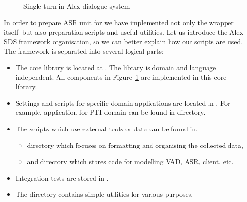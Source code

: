 \begin{figure}
    \begin{center}
    
    \caption{Single turn in Alex dialogue system}
    \label{fig:alex} 
    \end{center}
\end{figure}

In order to prepare \ac{ASR} unit for  we have implemented not only the wrapper itself, but also preparation scripts and useful utilities. 
Let us introduce the Alex \ac{SDS} framework organisation, so we can better explain how our scripts are used.
The framework is separated into several logical parts:
\begin{itemize}
    \item The core library is located at . The library is domain and language independent. All components in Figure~\ref{fig:alex} are implemented in this core library.
    \item Settings and scripts for specific domain applications are located in .
        For example, application for \ac{PTI} domain can be found in  directory.
    \item The scripts which use external tools or data can be found in:
        \begin{itemize}
            \item {} directory which focuses on formatting and organising the collected data,
            \item and \term {} directory which stores code for modelling \ac{VAD}, \ac{ASR},  client, etc.
        \end{itemize}
    \item Integration tests are stored in .
    \item The  directory contains simple utilities for various purposes.
\end{itemize}


